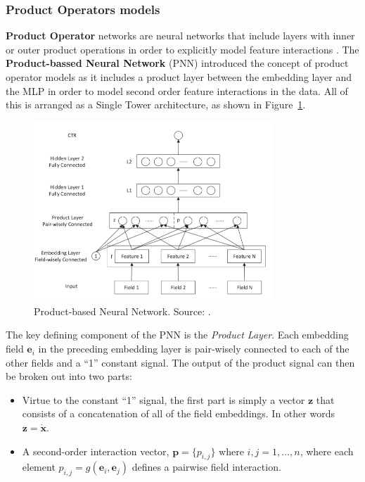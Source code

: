 \documentclass{mldsmsc}
\begin{document}
\subsubsection{Product Operators models}

\textbf{Product Operator} networks are neural networks that include layers with inner or outer
product operations in order to explicitly model feature interactions \citep{RefWorks:zhang2021deep}.
The \textbf{Product-bassed Neural Network} (PNN) introduced the concept of product operator models
as it includes a product layer between the embedding layer and the MLP in order to model second
order feature interactions in the data. All of this is arranged as a Single Tower architecture, as shown
in Figure~\ref{fig:pnn}.

\begin{figure}[h]
    \centering
    \includegraphics[width=0.8\textwidth]{../figures/pnn.png}
    \caption{Product-based Neural Network. Source: \citep{RefWorks:qu2016product-based}.}
    \label{fig:pnn}
\end{figure}

The key defining component of the PNN is the \emph{Product Layer}. Each embedding field $\mathbf{e}_i$
in the preceding embedding layer is pair-wisely connected to each of the other fields and a ``1''
constant signal. The output of the product signal can then be broken out into two parts:

\begin{itemize}
    \item Virtue to the constant ``1'' signal, the first part is simply a vector $\mathbf{z}$ that consists of a concatenation
    of all of the field embeddings. In other words $\mathbf{z} = \dot{\mathbf{x}}$.
    \item A second-order interaction vector, $\mathbf{p} = \{p_{i,j}\}\text{ where } i,j = 1, \ldots, n$, where each element
    $p_{i,j} = g(\mathbf{e}_i, \mathbf{e}_j)$ defines a pairwise field interaction.
\end{itemize}
\end{document}
